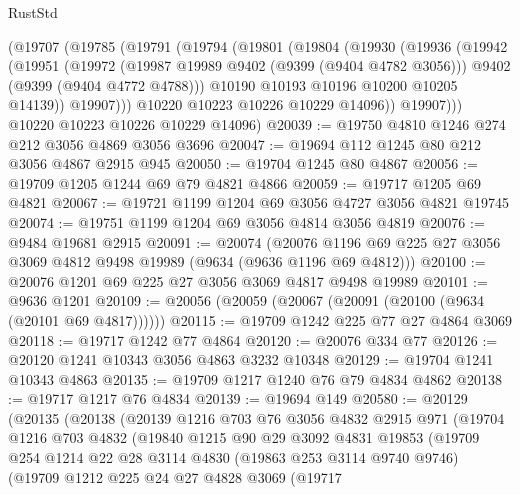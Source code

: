 \begin{lexlean}{RustStd}
\begin{coremodule}
      (@19707
        (@19785
          (@19791
            (@19794
              (@19801
                (@19804
                  (@19930
                    (@19936
                      (@19942
                        (@19951
                          (@19972
                            (@19987 @19989 @9402 (@9399 (@9404 @4782 @3056)))
                            @9402
                            (@9399 (@9404 @4772 @4788)))
                          @10190
                          @10193
                          @10196
                          @10200
                          @10205
                          @14139))
                      @19907)))
                @10220
                @10223
                @10226
                @10229
                @14096))
            @19907)))
      @10220
      @10223
      @10226
      @10229
      @14096)
@20039 := @19750 @4810 @1246 @274 @212 @3056 @4869 @3056 @3696
@20047 := @19694 @112 @1245 @80 @212 @3056 @4867 @2915 @945
@20050 := @19704 @1245 @80 @4867
@20056 := @19709 @1205 @1244 @69 @79 @4821 @4866
@20059 := @19717 @1205 @69 @4821
@20067 := @19721 @1199 @1204 @69 @3056 @4727 @3056 @4821 @19745
@20074 := @19751 @1199 @1204 @69 @3056 @4814 @3056 @4819
@20076 := @9484 @19681 @2915
@20091 := @20074
    (@20076 @1196 @69 @225 @27 @3056 @3069 @4812 @9498 @19989 (@9634 (@9636 @1196 @69 @4812)))
@20100 := @20076 @1201 @69 @225 @27 @3056 @3069 @4817 @9498 @19989
@20101 := @9636 @1201
@20109 := @20056 (@20059 (@20067 (@20091 (@20100 (@9634 (@20101 @69 @4817))))))
@20115 := @19709 @1242 @225 @77 @27 @4864 @3069
@20118 := @19717 @1242 @77 @4864
@20120 := @20076 @334 @77
@20126 := @20120 @1241 @10343 @3056 @4863 @3232 @10348
@20129 := @19704 @1241 @10343 @4863
@20135 := @19709 @1217 @1240 @76 @79 @4834 @4862
@20138 := @19717 @1217 @76 @4834
@20139 := @19694 @149
@20580 := @20129
    (@20135
      (@20138
        (@20139
          @1216
          @703
          @76
          @3056
          @4832
          @2915
          @971
          (@19704
            @1216
            @703
            @4832
            (@19840
              @1215
              @90
              @29
              @3092
              @4831
              @19853
              (@19709
                @254
                @1214
                @22
                @28
                @3114
                @4830
                (@19863 @253 @3114 @9740 @9746)
                (@19709
                  @1212
                  @225
                  @24
                  @27
                  @4828
                  @3069
                  (@19717

\end{coremodule}
\end{lexlean}
